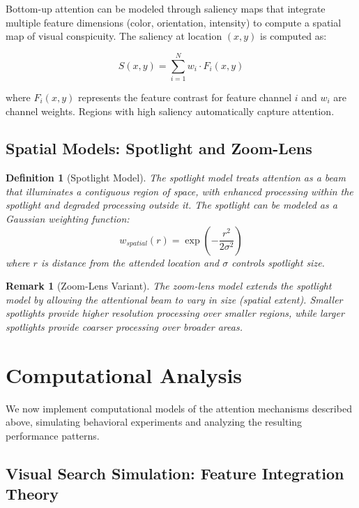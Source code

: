 \documentclass[a4paper, 11pt]{article}
\newtheorem{definition}{Definition}[section]
\newtheorem{remark}{Remark}[section]
\begin{document}
Bottom-up attention can be modeled through saliency maps that integrate multiple feature dimensions (color, orientation, intensity) to compute a spatial map of visual conspicuity. The saliency at location $(x,y)$ is computed as:

\begin{equation}
S(x,y) = \sum_{i=1}^{N} w_i \cdot F_i(x,y)
\end{equation}

where $F_i(x,y)$ represents the feature contrast for feature channel $i$ and $w_i$ are channel weights. Regions with high saliency automatically capture attention.

\subsection{Spatial Models: Spotlight and Zoom-Lens}

\begin{definition}[Spotlight Model]
The spotlight model treats attention as a beam that illuminates a contiguous region of space, with enhanced processing within the spotlight and degraded processing outside it. The spotlight can be modeled as a Gaussian weighting function:
\begin{equation}
w_{spatial}(r) = \exp\left(-\frac{r^2}{2\sigma^2}\right)
\end{equation}
where $r$ is distance from the attended location and $\sigma$ controls spotlight size.
\end{definition}

\begin{remark}[Zoom-Lens Variant]
The zoom-lens model extends the spotlight model by allowing the attentional beam to vary in size (spatial extent). Smaller spotlights provide higher resolution processing over smaller regions, while larger spotlights provide coarser processing over broader areas.
\end{remark}

\section{Computational Analysis}

We now implement computational models of the attention mechanisms described above, simulating behavioral experiments and analyzing the resulting performance patterns.

\subsection{Visual Search Simulation: Feature Integration Theory}
\end{document}

